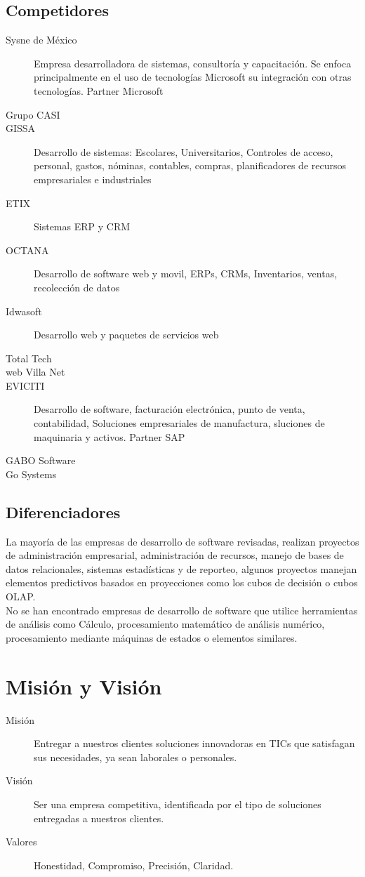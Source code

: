 \documentclass[12pt,spanish,lettersize]{report}
\begin{document}
\subsection{Competidores}
\begin{description}
\item[Sysne de M\'exico] Empresa desarrolladora de sistemas, consultor\'ia y capacitaci\'on. Se enfoca principalmente en el uso de tecnolog\'ias Microsoft  su integraci\'on con otras tecnolog\'ias. Partner Microsoft
\item[Grupo CASI]
\item[GISSA] Desarrollo de sistemas: Escolares, Universitarios, Controles de acceso, personal, gastos, n\'ominas, contables, compras, planificadores de recursos empresariales e industriales
\item[ETIX] Sistemas ERP y CRM
\item[OCTANA] Desarrollo de software web y movil, ERPs, CRMs, Inventarios, ventas, recolecci\'on de datos
\item[Idwasoft] Desarrollo web y paquetes de servicios web
\item[Total Tech]
\item[web Villa Net]
\item[EVICITI] Desarrollo de software, facturaci\'on electr\'onica, punto de venta, contabilidad, Soluciones empresariales de manufactura, sluciones de maquinaria y activos. Partner SAP
\item[GABO Software]
\item[Go Systems]
\end{description}
\subsection{Diferenciadores}
La mayor\'ia de las empresas de desarrollo de software revisadas, realizan proyectos de administraci\'on empresarial, administraci\'on de recursos, manejo de bases de datos relacionales, sistemas estad\'isticas y de reporteo, algunos proyectos manejan elementos predictivos basados en proyecciones como los cubos de decisi\'on o cubos OLAP.\\
No se han encontrado empresas de desarrollo de software que utilice herramientas de an\'alisis como C\'alculo, procesamiento matem\'atico de an\'alisis num\'erico, procesamiento mediante m\'aquinas de estados o elementos similares.
\section{Misi\'on y Visi\'on}
\begin{description}
\item[Misi\'on]
Entregar a nuestros clientes soluciones innovadoras en TICs que satisfagan sus necesidades, ya sean laborales o personales.
\item[Visi\'on]
Ser una empresa competitiva, identificada por el tipo de soluciones entregadas a nuestros clientes.
\item[Valores]
Honestidad, Compromiso, Precisi\'on, Claridad.
\end{description}
\end{document}
